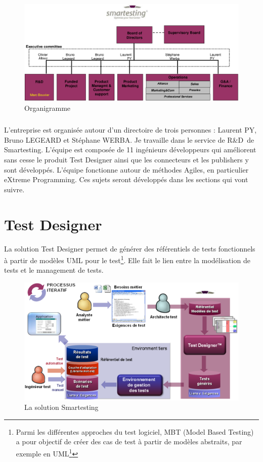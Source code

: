 \begin{figure}[!ht]
\centering
\includegraphics[width=\textwidth]{Illustrations/Organigramme_with_me.png}
\caption{Organigramme}
\label{figure:Organigramme de Smartesting}
\end{figure}

\subparagraph*{}
L'entreprise est organisée autour d'un directoire de trois personnes : Laurent PY, Bruno LEGEARD et Stéphane WERBA. Je travaille dans le service de R\&D{}\ de Smartesting.  L'équipe est composée de 11 ingénieurs développeurs qui améliorent sans cesse le produit Test Designer ainsi que les connecteurs et les publishers y sont développés. L'équipe fonctionne autour de méthodes Agiles, en particulier eXtreme Programming. Ces sujets seront développés dans les sections qui vont suivre.

\pagebreak

\section{Test Designer}
La solution Test Designer permet de générer des référentiels de tests fonctionnels à partir de modèles UML pour le test\footnote{Parmi les différentes approches du test logiciel, MBT (Model Based Testing) a pour objectif de créer des cas de test à partir de modèles abstraits, par exemple en UML\footnote{Unified Modelling Language}}. Elle fait le lien entre la modélisation de tests et le management de tests.

\begin{figure}[!ht]
\centering
\includegraphics[width=\textwidth]{Illustrations/TheSolutionSmartesting.png}
\caption{La solution Smartesting}
\label{figure:La Solution Smartesting}
\end{figure}

